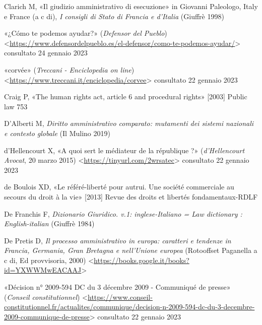\documentclass[12pt,it,a4paper,]{report}
\newlength{\cslhangindent}
\newenvironment{CSLReferences}[2] %
 {%
  \setlength{\parindent}{0pt}
  \ifodd #1 \everypar{\setlength{\hangindent}{\cslhangindent}}\ignorespaces\fi
  \ifnum #2 > 0
  \setlength{\parskip}{#2\baselineskip}
  \fi
 }%
 {}
\begin{document}
\begin{CSLReferences}{0}{0}
\leavevmode{}%
Clarich M, {«Il giudizio amministrativo di esecuzione»} in Giovanni
Paleologo, Italy e France (a c di), \emph{I consigli di Stato di Francia
e d'Italia} (Giuffrè 1998)

\leavevmode{}%
{«¿Cómo te podemos ayudar?»} (\emph{Defensor del Pueblo})
\textless{}\url{https://www.defensordelpueblo.es/el-defensor/como-te-podemos-ayudar/}\textgreater{}
consultato 24 gennaio 2023

\leavevmode{}%
{«corvée»} (\emph{Treccani - Enciclopedia on line})
\textless{}\url{https://www.treccani.it/enciclopedia/corvee}\textgreater{}
consultato 22 gennaio 2023

\leavevmode{}%
Craig P, {«The human rights act, article 6 and procedural rights»}
{[}2003{]} Public law 753

\leavevmode{}%
D'Alberti M, \emph{Diritto amministrativo comparato: mutamenti dei
sistemi nazionali e contesto globale} (Il Mulino 2019)

\leavevmode{}%
d'Hellencourt X, {«A quoi sert le médiateur de la république ?»}
(\emph{d'Hellencourt Avocat}, 20 marzo 2015)
\textless{}\url{https://tinyurl.com/2wrsatec}\textgreater{} consultato
22 gennaio 2023

\leavevmode{}%
de Boulois XD, {«Le référé-liberté pour autrui. Une société commerciale
au secours du droit à la vie»} {[}2013{]} Revue des droits et libertés
fondamentaux-RDLF

\leavevmode{}%
De Franchis F, \emph{Dizionario Giuridico. v.1: inglese-Italiano = Law
dictionary : English-italian} (Giuffrè 1984)

\leavevmode{}%
De Pretis D, \emph{Il processo amministrativo in europa: caratteri e
tendenze in Francia, Germania, Gran Bretagna e nell'Unione europea}
(Rotooffset Paganella a c di, Ed provvisoria, 2000)
\textless{}\url{https://books.google.it/books?id=YXWWMwEACAAJ}\textgreater{}

\leavevmode{}%
{«Décision n° 2009-594 DC du 3 décembre 2009 - Communiqué de presse»}
(\emph{Conseil constitutionnel})
\textless{}\url{https://www.conseil-constitutionnel.fr/actualites/communique/decision-n-2009-594-dc-du-3-decembre-2009-communique-de-presse}\textgreater{}
consultato 22 gennaio 2023


\end{CSLReferences}
\end{document}
